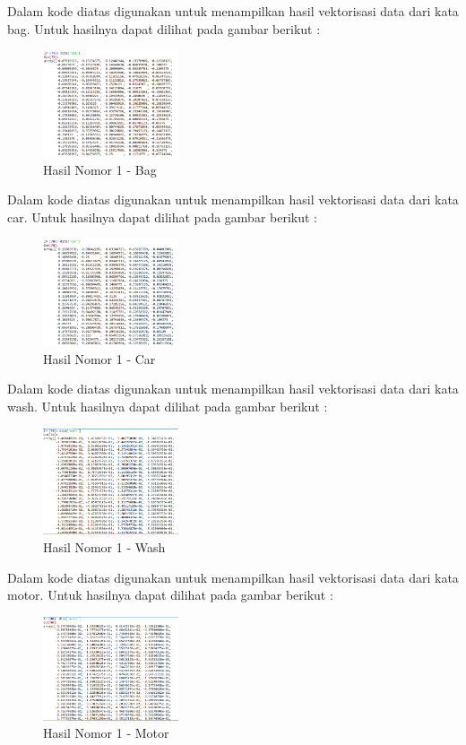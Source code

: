 \begin{enumerate}

Dalam kode diatas digunakan untuk menampilkan hasil vektorisasi data dari kata bag. Untuk hasilnya dapat dilihat pada gambar berikut :
\hfill\break
	\begin{figure}[H]
		\includegraphics[width=4cm]{figures/1174054/5/14.png}
		\centering
		\caption{Hasil Nomor 1 - Bag}
	\end{figure}
	

Dalam kode diatas digunakan untuk menampilkan hasil vektorisasi data dari kata car. Untuk hasilnya dapat dilihat pada gambar berikut :
\hfill\break
	\begin{figure}[H]
		\includegraphics[width=4cm]{figures/1174054/5/15.png}
		\centering
		\caption{Hasil Nomor 1 - Car}
	\end{figure}
	

Dalam kode diatas digunakan untuk menampilkan hasil vektorisasi data dari kata wash. Untuk hasilnya dapat dilihat pada gambar berikut :
\hfill\break
	\begin{figure}[H]
		\includegraphics[width=4cm]{figures/1174054/5/16.png}
		\centering
		\caption{Hasil Nomor 1 - Wash}
	\end{figure}
	

Dalam kode diatas digunakan untuk menampilkan hasil vektorisasi data dari kata motor. Untuk hasilnya dapat dilihat pada gambar berikut :
\hfill\break
	\begin{figure}[H]
		\includegraphics[width=4cm]{figures/1174054/5/17.png}
		\centering
		\caption{Hasil Nomor 1 - Motor}
	\end{figure}
	

\end{enumerate}
